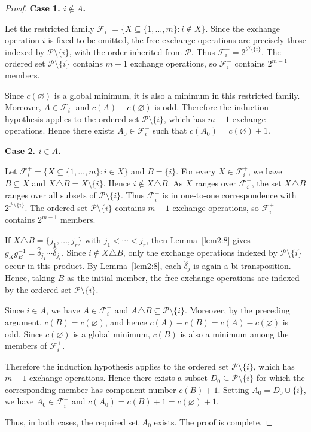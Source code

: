 \documentclass[12pt]{article}
\theoremstyle{definition}
\begin{document}
\begin{proof}
\medskip
\noindent\textbf{Case 1. $i\notin A$.}

Let the restricted family
$\mathcal F_i^-=\{X\subseteq\{1,\ldots,m\}:i\notin X\}$.
Since the exchange operation $i$ is fixed to be omitted, the free
exchange operations are precisely those indexed by
$\mathcal P\setminus\{i\}$, with the order inherited from
$\mathcal P$. Thus
$\mathcal F_i^-=2^{\mathcal P\setminus\{i\}}$.
The ordered set $\mathcal P\setminus\{i\}$ contains $m-1$ exchange
operations, so $\mathcal F_i^-$  contains $2^{m-1}$
members.

Since $c(\varnothing)$ is a global minimum, it is also a minimum in
this restricted family. Moreover, $A\in\mathcal F_i^-$ and
$c(A)-c(\varnothing)$ is odd. Therefore the induction hypothesis
applies to the ordered set $\mathcal P\setminus\{i\}$, which has
$m-1$ exchange operations. Hence there exists
$A_0\in\mathcal F_i^-$ such that
$c(A_0)=c(\varnothing)+1$.

\medskip
\noindent\textbf{Case 2. $i\in A$.}

Let $\mathcal F_i^+=\{X\subseteq\{1,\ldots,m\}:i\in X\}$ and
$B=\{i\}$. For every $X\in\mathcal F_i^+$, we have $B\subseteq X$
and $X\triangle B=X\setminus\{i\}$. Hence
$i\notin X\triangle B$. As $X$ ranges over
$\mathcal F_i^+$, the set $X\triangle B$ ranges over all subsets of
$\mathcal P\setminus\{i\}$. Thus $\mathcal F_i^+$ is in one-to-one
correspondence with $2^{\mathcal P\setminus\{i\}}$. The ordered set
$\mathcal P\setminus\{i\}$ contains $m-1$ exchange operations, so
$\mathcal F_i^+$ contains $2^{m-1}$ members.

If $X\triangle B=\{j_1,\ldots,j_r\}$ with
$j_1<\cdots<j_r$, then Lemma~\ref{lem2:8} gives
$g_Xg_B^{-1}
=\widehat\delta_{j_1}\cdots\widehat\delta_{j_r}$.
Since $i\notin X\triangle B$, only the exchange operations indexed by
$\mathcal P\setminus\{i\}$ occur in this product. By
Lemma~\ref{lem2:8}, each $\widehat\delta_j$ is again a
bi-transposition. Hence, taking $B$ as the initial member, the free
exchange operations are indexed by the ordered set
$\mathcal P\setminus\{i\}$.

Since $i\in A$, we have $A\in\mathcal F_i^+$ and
$A\triangle B\subseteq\mathcal P\setminus\{i\}$. Moreover, by the
preceding argument, $c(B)=c(\varnothing)$, and hence
$c(A)-c(B)=c(A)-c(\varnothing)$ is odd. Since
$c(\varnothing)$ is a global minimum, $c(B)$ is also a minimum among
the members of $\mathcal F_i^+$.

Therefore the induction hypothesis applies to the ordered set
$\mathcal P\setminus\{i\}$, which has $m-1$ exchange operations. Hence
there exists a subset $D_0\subseteq\mathcal P\setminus\{i\}$ for which
the corresponding member has component number $c(B)+1$. Setting
$A_0=D_0\cup\{i\}$, we have $A_0\in\mathcal F_i^+$ and
$c(A_0)=c(B)+1=c(\varnothing)+1$.

Thus, in both cases, the required set $A_0$ exists.  The proof is complete.
\end{proof}
\end{document}

